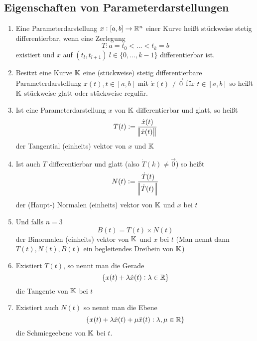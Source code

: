 \subsection{Eigenschaften von Parameterdarstellungen}
\begin{enumerate}[label= (\alph*)]
    \item Eine Parameterdarstellung $x:[a,b] \rightarrow \mathbb{R}^n$ einer Kurve heißt
        stückweise stetig differentierbar, wenn eine Zerlegung
        \begin{equation}
            T: a=t_0 < \ldots < t_k = b
        \end{equation}
        existiert und $x$ auf $(t_l, t_{l+1})\ l\in\{0,\ldots,k-1\}$
        differentierbar ist.
    \item Besitzt eine Kurve $\mathbb{K}$ eine (stückweise) stetig differentierbare
        Parameterdarstellung $x(t), t\in [a,b]$ mit $\dot{x}(t) \neq \vec{0}$
        für $t \in [a,b]$ so heißt $\mathbb{K}$ stückweise glatt oder stückweise regulär.
    \item Ist eine Parameterdarstellung $x$ von $\mathbb{K}$ differentierbar und glatt,
        so heißt
        \begin{equation*}
            T(t) := \frac{\dot{x}(t)}{\norm{\dot{x}(t)}}
        \end{equation*}
        der Tangential (einheits) vektor von $x$ und $\mathbb{K}$
    \item Ist auch $T$ differentierbar und glatt (also $\dot{T}(k) \neq \vec{0}$)
        so heißt
        \begin{equation*}
            N(t) := \frac{\dot{T}(t)}{\norm{\dot{T}(t)}}
        \end{equation*}
        der (Haupt-) Normalen (einheits) vektor von $\mathbb{K}$ und $x$ bei $t$
    \item Und falls $n=3$
        \begin{equation*}
            B(t) = T(t) \times N(t)
        \end{equation*}
        der Binormalen (einheits) vektor von $\mathbb{K}$ und $x$ bei $t$
        (Man nennt dann $T(t), N(t), B(t)$ ein begleitendes Dreibein von $\mathbb{K}$)
    \item Existiert $T(t)$, so nennt man die Gerade
        \begin{equation*}
            \{x(t) + \lambda \dot{x}(t): \lambda \in \mathbb{R}\}
        \end{equation*}
        die Tangente von $\mathbb{K}$ bei $t$
    \item Existiert auch $N(t)$ so nennt man die Ebene
        \begin{equation*}
            \{ x(t) + \lambda \dot{x}(t) + \mu \ddot{x}(t): \lambda, \mu \in \mathbb{R}\}
        \end{equation*}
        die Schmiegeebene von $\mathbb{K}$ bei $t$.
\end{enumerate}

